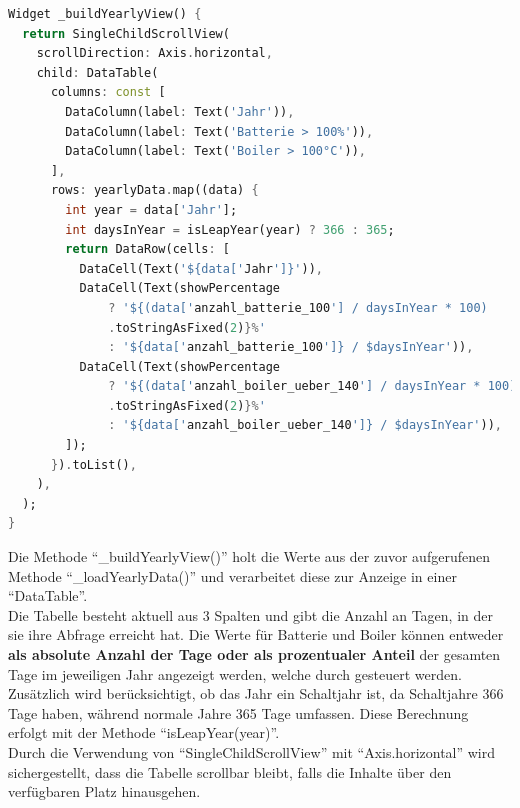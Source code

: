 \documentclass{article}
\begin{document}
    \begin{lstlisting}[language=Dart]
Widget _buildYearlyView() {
  return SingleChildScrollView(
    scrollDirection: Axis.horizontal,
    child: DataTable(
      columns: const [
        DataColumn(label: Text('Jahr')),
        DataColumn(label: Text('Batterie > 100%')),
        DataColumn(label: Text('Boiler > 100°C')),
      ],
      rows: yearlyData.map((data) {
        int year = data['Jahr'];
        int daysInYear = isLeapYear(year) ? 366 : 365;
        return DataRow(cells: [
          DataCell(Text('${data['Jahr']}')),
          DataCell(Text(showPercentage
              ? '${(data['anzahl_batterie_100'] / daysInYear * 100)
              .toStringAsFixed(2)}%'
              : '${data['anzahl_batterie_100']} / $daysInYear')),
          DataCell(Text(showPercentage
              ? '${(data['anzahl_boiler_ueber_140'] / daysInYear * 100)
              .toStringAsFixed(2)}%'
              : '${data['anzahl_boiler_ueber_140']} / $daysInYear')),
        ]);
      }).toList(),
    ),
  );
}
    \end{lstlisting}

    Die Methode \enquote{\_buildYearlyView()} holt die Werte aus der zuvor aufgerufenen Methode
    \enquote{\_loadYearlyData()} und verarbeitet diese zur Anzeige in einer \enquote{DataTable}.\\
    Die Tabelle besteht aktuell aus 3 Spalten und gibt die Anzahl an Tagen, in der sie ihre Abfrage erreicht hat.
    Die Werte für Batterie und Boiler können entweder \textbf{als absolute Anzahl der Tage oder als prozentualer Anteil}
    der gesamten Tage im jeweiligen Jahr angezeigt werden, welche durch  gesteuert werden.
    Zusätzlich wird berücksichtigt, ob das Jahr ein Schaltjahr ist, da Schaltjahre 366 Tage haben, während normale Jahre 365 Tage umfassen.
    Diese Berechnung erfolgt mit der Methode \enquote{isLeapYear(year)}. \\
    Durch die Verwendung von \enquote{SingleChildScrollView} mit \enquote{Axis.horizontal} wird sichergestellt,
    dass die Tabelle scrollbar bleibt, falls die Inhalte über den verfügbaren Platz hinausgehen.
\end{document}
